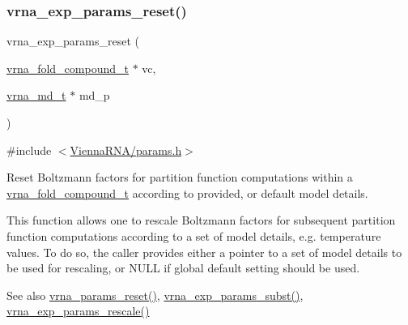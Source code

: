 \subsubsection{\texorpdfstring{vrna\+\_\+exp\+\_\+params\+\_\+reset()}{vrna\_exp\_params\_reset()}}
{\footnotesize\ttfamily vrna\+\_\+exp\+\_\+params\+\_\+reset (\begin{DoxyParamCaption}\item[{\hyperlink{group__fold__compound_ga1b0cef17fd40466cef5968eaeeff6166}{vrna\+\_\+fold\+\_\+compound\+\_\+t} $\ast$}]{vc,  }\item[{\hyperlink{group__model__details_ga1f8a10e12a0a1915f2a4eff0b28ea17c}{vrna\+\_\+md\+\_\+t} $\ast$}]{md\+\_\+p }\end{DoxyParamCaption})}



{\ttfamily \#include $<$\hyperlink{params_8h}{Vienna\+R\+N\+A/params.\+h}$>$}



Reset Boltzmann factors for partition function computations within a \hyperlink{group__fold__compound_ga1b0cef17fd40466cef5968eaeeff6166}{vrna\+\_\+fold\+\_\+compound\+\_\+t} according to provided, or default model details. 

This function allows one to rescale Boltzmann factors for subsequent partition function computations according to a set of model details, e.\+g. temperature values. To do so, the caller provides either a pointer to a set of model details to be used for rescaling, or N\+U\+LL if global default setting should be used.

\begin{DoxySeeAlso}{See also}
\hyperlink{group__energy__parameters_gac40dc82e48a72a97cfc58b9da08a7792}{vrna\+\_\+params\+\_\+reset()}, \hyperlink{group__energy__parameters_ga8e7ac4fab3b0cc03afbc134eaafb3525}{vrna\+\_\+exp\+\_\+params\+\_\+subst()}, \hyperlink{group__energy__parameters_gad607bc3a5b5da16400e2ca4ea5560233}{vrna\+\_\+exp\+\_\+params\+\_\+rescale()} 
\end{DoxySeeAlso}


